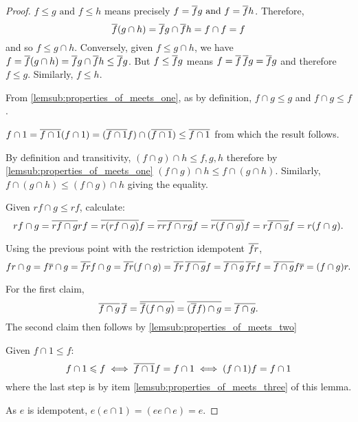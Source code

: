 \begin{proof}
\bproofenum
\item $f\le g \text{ and } f \le h$ means precisely
$f = \overline{f} g \text{ and } f = \overline{f} h$.
Therefore,
\[\overline{f} (g\cap h) =  \overline{f} g \cap \overline{f} h =  f\cap f = f\]
and so $f \le g \cap h$.
Conversely, given $f \le g\cap h$, we have $f = \overline{f} (g\cap h) =
\overline{f} g \cap \overline{f} h \le \overline{f} g $. But $f \le \overline{f}
g$ means $f = \overline{f}\,\overline{f} g = \overline{f}g$ and therefore $f \le
g$. Similarly, $f \le h$.
\item From \vref{lemsub:properties_of_meets_one}, as by definition, $f\cap g \le g$ and $f \cap g \le f$.

\item $f\cap 1 = \overline{f\cap 1} (f \cap 1)=
(\overline{f \cap 1} f ) \cap (\overline{f \cap 1}) \le \overline{f \cap 1}$ from
which the result follows. %

\item By definition and transitivity, $(f\cap g)\cap h \le f, g, h$
therefore by \vref{lemsub:properties_of_meets_one} $(f \cap g) \cap h \le
 f \cap (g \cap h)$. Similarly, $f \cap (g \cap h) \le(f \cap g) \cap h$
giving the equality.
\item Given  $r f \cap g \le r f$, calculate:
\[
r f\cap g
= \overline{r f\cap g} r f
= \overline{r (r f\cap g)} f
= \overline{r r f\cap r g} f
= \overline{r (f\cap g)} f
= r \overline{f\cap g} f
= r (f\cap g).\]
\item Using the previous point with the restriction
idempotent $\overline{f r}$,
\[
f r \cap g
= f \restr{r} \cap g   %
= \restr{f r }f \cap g  %
=\restr{f r}(f\cap g)   %
= \restr{f r}\, \restr{f\cap g} f %
=  \restr{f\cap g}\, \restr{f r} f %
=  \restr{f\cap g} f \restr{r}  %
= (f\cap g) r.\] %
\item For the first claim,
\[\overline{f\cap g}\, \overline{f}
=\overline{\overline{f}(f\cap g)}
=\overline{(\overline{f}f)\cap g}
=\overline{f\cap g}.\]
The second claim then follows by \vref{lemsub:properties_of_meets_two}
\item Given $ f \cap 1 \leq f$:
\[ f \cap 1 \leqslant f \iff  \overline{f \cap 1} f = f \cap 1
\iff  (f \cap 1) f = f \cap 1\]
where the last step is by item \vref{lemsub:properties_of_meets_three} of this lemma.
\item As $e$ is idempotent, $e (e\cap 1) = (e e \cap e) = e$.

\eproofenum
\end{proof}
